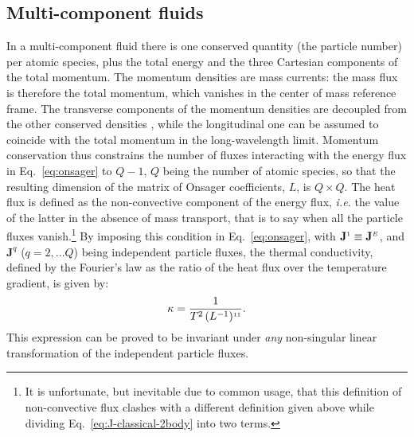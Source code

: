 \subsection{Multi-component fluids} \label{sec:multi-component}
In a multi-component fluid there is one conserved quantity (the particle number) per atomic species, plus the total energy and the three Cartesian components of the total momentum. The momentum densities are mass currents: the mass flux is therefore the total momentum, which vanishes in the center of mass reference frame. The transverse components of the momentum densities are decoupled from the other conserved densities \cite{Foster1975}, while the longitudinal one can be assumed to coincide with the total momentum in the long-wavelength limit. Momentum conservation thus constrains the number of fluxes interacting with the energy flux in Eq.~\eqref{eq:onsager} to $Q-1$, $Q$ being the number of atomic species, so that the resulting dimension of the matrix of Onsager coefficients, $L$, is $Q\times Q$. The heat flux is defined as the non-convective component of the energy flux, \emph{i.e.} the value of the latter in the absence of mass transport, that is to say when all the particle fluxes vanish.\footnote{It is unfortunate, but inevitable due to common usage, that this definition of non-convective flux clashes with a different definition given above while dividing Eq.~\eqref{eq:J-classical-2body} into two terms.} By imposing this condition in Eq.~\eqref{eq:onsager}, with $\mathbf J^{\scriptscriptstyle 1} \equiv \mathbf{J}^{\scriptscriptstyle E}$, and $\mathbf{J}^{q}$ ($q =2,\dots Q$) being independent particle fluxes, the thermal conductivity, defined by the Fourier's law as the ratio of the heat flux over the temperature gradient, is given by:
\begin{equation}
\kappa = \frac{1}{T^2 \,(L^{-1})^{\smallone\smallone}}. \label{eq:multi_kappa}
\end{equation}
This expression can be proved to be invariant under \textit{any} non-singular linear transformation of the independent particle fluxes. 

